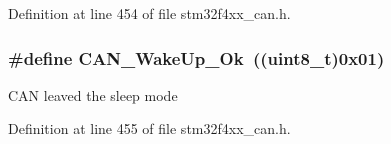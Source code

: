 Definition at line 454 of file stm32f4xx\-\_\-can.\-h.

\hypertarget{group___c_a_n__wake__up__constants_ga152e4935cf85bdfb803eb36b656cd690}{
\subsubsection[{C\-A\-N\-\_\-\-Wake\-Up\-\_\-\-Ok}]{\setlength{\rightskip}{0pt plus 5cm}\#define C\-A\-N\-\_\-\-Wake\-Up\-\_\-\-Ok~((uint8\-\_\-t)0x01)}}\label{group___c_a_n__wake__up__constants_ga152e4935cf85bdfb803eb36b656cd690}
C\-A\-N leaved the sleep mode 

Definition at line 455 of file stm32f4xx\-\_\-can.\-h.

